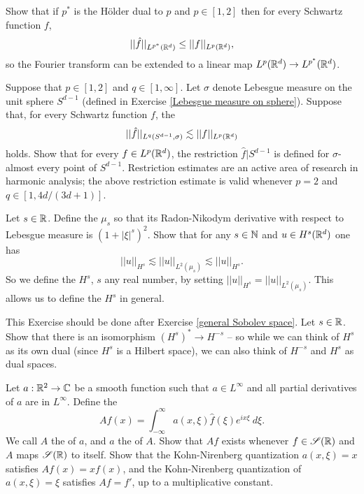 \begin{exercise}
Show that if $p^*$ is the H\"older dual to $p$ and $p \in [1, 2]$ then for every Schwartz function $f$,
\[||\hat f||_{L^{p^*}(\mathbb{R}^d)} \leq ||f||_{L^p(\mathbb{R}^d)},\]
so the Fourier transform can be extended to a linear map $L^p(\mathbb{R}^d) \to L^{p^*}(\mathbb{R}^d)$.
\end{exercise}

\begin{exercise}
Suppose that $p \in [1, 2]$ and $q \in [1, \infty]$.
Let $\sigma$ denote Lebesgue measure on the unit sphere $S^{d-1}$ (defined in Exercise \ref{Lebesgue measure on sphere}).
Suppose that, for every Schwartz function $f$, the 
\[||\hat f||_{L^q(S^{d-1}, \sigma)} \lesssim ||f||_{L^p(\mathbb{R}^d)}\]
holds.
Show that for every $f \in L^p(\mathbb{R}^d)$, the restriction $\hat f|S^{d-1}$ is defined for $\sigma$-almost every point of $S^{d-1}$.
Restriction estimates are an active area of research in harmonic analysis; the above restriction estimate is valid whenever $p = 2$ and $q \in [1, 4d/(3d+1)]$.
\end{exercise}

\begin{exercise}
\label{general Sobolev space}
Let $s \in \mathbb{R}$. Define the  $\mu_s$ so that its Radon-Nikodym derivative with respect to Lebesgue measure is $(1 + |\xi|^s)^2$.
Show that for any $s \in \mathbb{N}$ and $u \in H^s(\mathbb{R}^d)$ one has
\[||u||_{H^s} \lesssim ||u||_{L^2(\mu_s)} \lesssim ||u||_{H^s}.\]
So we define the  $H^s$, $s$ any real number, by setting $||u||_{H^s} = ||u||_{L^2(\mu_s)}$.
This allows us to define the  $H^s$ in general.
\end{exercise}

\begin{exercise}
This Exercise should be done after Exercise \ref{general Sobolev space}.
Let $s \in \mathbb{R}$. Show that there is an isomorphism $(H^s)^* \to H^{-s}$ -- so while we can think of $H^s$ as its own dual (since $H^s$ is a Hilbert space), we can also think of $H^{-s}$ and $H^s$ as dual spaces.
\end{exercise}

\begin{exercise}
Let $a: \mathbb{R}^2 \to \mathbb{C}$ be a smooth function such that $a \in L^\infty$ and all partial derivatives of $a$ are in $L^\infty$.
Define the 
\[Af(x) = \int_{-\infty}^{\infty} a(x, \xi) \hat f(\xi) e^{ix\xi}~d\xi.\]
We call $A$ the  of $a$, and $a$ the  of $A$.
Show that $Af$ exists whenever $f \in \mathscr S(\mathbb{R})$ and $A$ maps $\mathscr S(\mathbb{R})$ to itself.
Show that the Kohn-Nirenberg quantization $a(x, \xi) = x$ satisfies $Af(x) = xf(x)$, and the Kohn-Nirenberg quantization of $a(x, \xi) = \xi$ satisfies $Af = f'$, up to a multiplicative constant.
\end{exercise}


